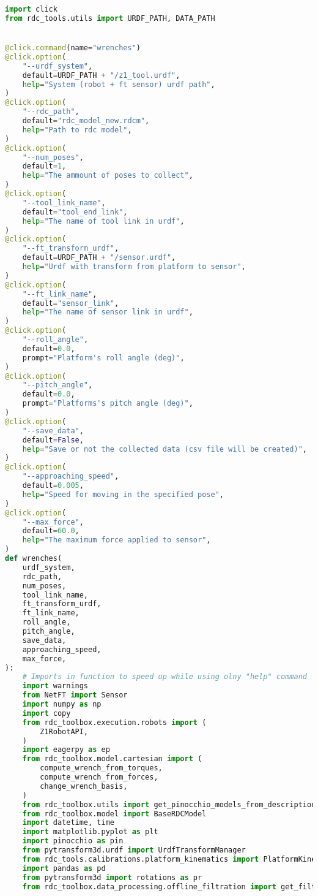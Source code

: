 \begin{lstlisting}[language=python, caption=\raggedright{verification/fs\_verification.py}, frame=single]
import click
from rdc_tools.utils import URDF_PATH, DATA_PATH


@click.command(name="wrenches")
@click.option(
    "--urdf_system",
    default=URDF_PATH + "/z1_tool.urdf",
    help="System (robot + ft sensor) urdf path",
)
@click.option(
    "--rdc_path",
    default="rdc_model_new.rdcm",
    help="Path to rdc model",
)
@click.option(
    "--num_poses",
    default=1,
    help="The ammount of poses to collect",
)
@click.option(
    "--tool_link_name",
    default="tool_end_link",
    help="The name of tool link in urdf",
)
@click.option(
    "--ft_transform_urdf",
    default=URDF_PATH + "/sensor.urdf",
    help="Urdf with transform from platform to sensor",
)
@click.option(
    "--ft_link_name",
    default="sensor_link",
    help="The name of sensor link in urdf",
)
@click.option(
    "--roll_angle",
    default=0.0,
    prompt="Platform's roll angle (deg)",
)
@click.option(
    "--pitch_angle",
    default=0.0,
    prompt="Platforms's pitch angle (deg)",
)
@click.option(
    "--save_data",
    default=False,
    help="Save or not the collected data (csv file will be created)",
)
@click.option(
    "--approaching_speed",
    default=0.005,
    help="Speed for moving in the specified pose",
)
@click.option(
    "--max_force",
    default=60.0,
    help="The maximum force applied to sensor",
)
def wrenches(
    urdf_system,
    rdc_path,
    num_poses,
    tool_link_name,
    ft_transform_urdf,
    ft_link_name,
    roll_angle,
    pitch_angle,
    save_data,
    approaching_speed,
    max_force,
):
    # Imports in function to speed up while using olny "help" command
    import warnings
    from NetFT import Sensor
    import numpy as np
    import copy
    from rdc_toolbox.execution.robots import (
        Z1RobotAPI,
    )
    import eagerpy as ep
    from rdc_toolbox.model.cartesian import (
        compute_wrench_from_torques,
        compute_wrench_from_forces,
        change_wrench_basis,
    )
    from rdc_toolbox.utils import get_pinocchio_models_from_description
    from rdc_toolbox.model import BaseRDCModel
    import datetime, time
    import matplotlib.pyplot as plt
    import pinocchio as pin
    from pytransform3d.urdf import UrdfTransformManager
    from rdc_tools.calibrations.platform_kinematics import PlatformKinematics
    import pandas as pd
    from pytransform3d import rotations as pr
    from rdc_toolbox.data_processing.offline_filtration import get_filtred


\end{lstlisting}
